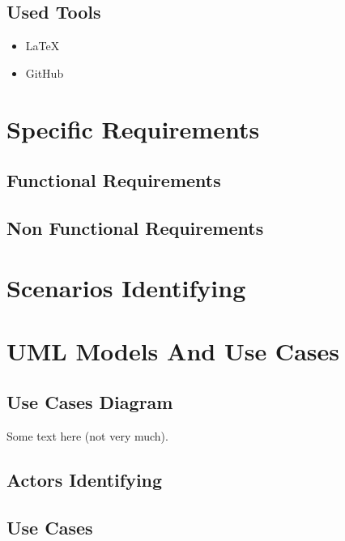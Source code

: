 \documentclass[english]{article}
\begin{document}
	\subsection{Used Tools}
	\begin{itemize}
		\item \LaTeX\\
		\item GitHub\\
	\end{itemize}
\section{Specific Requirements}
	\subsection{Functional Requirements}
	\subsection{Non Functional Requirements}

\section{Scenarios Identifying}
\section{UML Models And Use Cases}
	\subsection{Use Cases Diagram}
	\vspace*{\fill}
	\noindent

	\rule{0pt}{2cm}Some text here (not very much).


	\subsection{Actors Identifying}
	\subsection{Use Cases}
\end{document}
